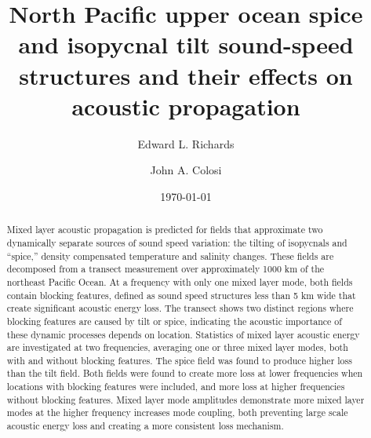 \documentclass[preprint,NumberedRefs]{JASA}
\begin{document}
\title[Mixed layer tilt and spice]{North Pacific upper ocean spice and isopycnal tilt sound-speed structures and their effects on acoustic propagation}
\author{Edward L. Richards}
\author{John A. Colosi}


\date{\today}


\begin{abstract}
Mixed layer acoustic propagation is predicted for fields that approximate two dynamically separate sources of sound speed variation: the tilting of isopycnals and “spice,” density compensated temperature and salinity changes. These fields are decomposed from a transect measurement over approximately 1000 km of the northeast Pacific Ocean. At a frequency with only one mixed layer mode, both fields contain blocking features, defined as sound speed structures less than 5 km wide that create significant acoustic energy loss. The transect shows two distinct regions where blocking features are caused by tilt or spice, indicating the acoustic importance of these dynamic processes depends on location. Statistics of mixed layer acoustic energy are investigated at two frequencies, averaging one or three mixed layer modes, both with and without blocking features. The spice field was found to produce higher loss than the tilt field. Both fields were found to create more loss at lower frequencies when locations with blocking features were included, and more loss at higher frequencies without blocking features. Mixed layer mode amplitudes demonstrate more mixed layer modes at the higher frequency increases mode coupling, both preventing large scale acoustic energy loss and creating a more consistent loss mechanism.

\end{abstract}

\maketitle
\end{document}
